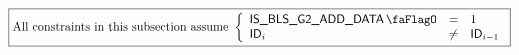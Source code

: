 \[
    \boxed{\text{All constraints in this subsection assume }
        \left\{ \begin{array}{lcl}
            \isBlsGTwoAddData      & =    & 1            \\
            \blsId_{i}             & \neq & \blsId_{i-1} \\
        \end{array} \right.
    }
\]